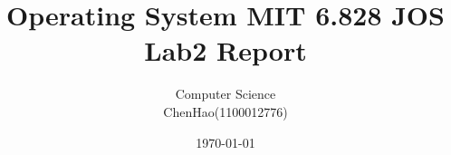 \documentclass[GBK,winfonts,a4paper,10pt]{ctexart}
\begin{document}
\rhead{}
\lhead{}
\cfoot{\thepage}
\renewcommand{\footrulewidth}{0.4pt}
\renewcommand{\algorithmicrequire}{\textbf{Input:}}
\renewcommand{\algorithmicensure}{\textbf{Output:}}
\setlength{\tabcolsep}{2pt}

\setlength{\parindent}{2em}

\thispagestyle{fancy}



\title{Operating System MIT 6.828 JOS Lab2 Report}
\author{Computer Science \\ ChenHao(1100012776) }
\date{\today}
\maketitle

\thispagestyle{fancy}

\tableofcontents

\newpage
\end{document}
